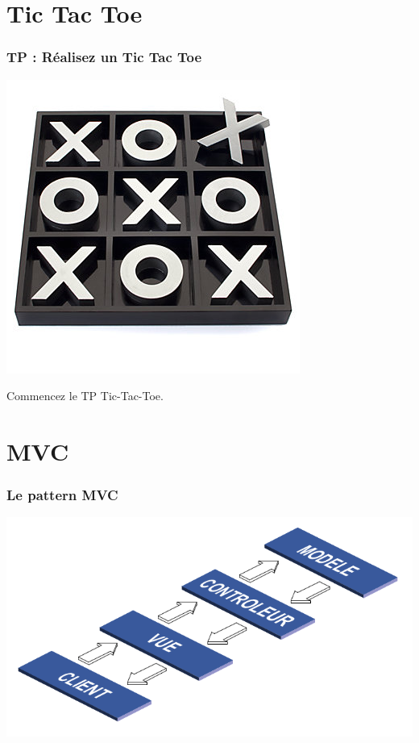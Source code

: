 \documentclass{beamer}
\begin{document}
\section{Tic Tac Toe}

\begin{frame}
\frametitle{TP : Réalisez un Tic Tac Toe}
\begin{center}
\includegraphics[scale=0.45]{tictactoe.jpg}
\end{center}
\begin{block}{}
\begin{center}
Commencez le TP Tic-Tac-Toe.
\end{center}
\end{block}
\end{frame}

\section{MVC}

\begin{frame}
\frametitle{Le pattern MVC}
\begin{center}
\includegraphics[scale=0.4]{mvc_intro.png}
\end{center}
\end{frame}
\end{document}
